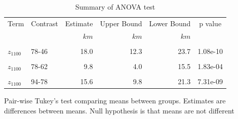 \documentclass[draft,linenumbers]{agujournal2018}
\begin{document}
\begin{table}

\caption{\label{tab:anova}Summary of ANOVA test}
\centering
\fontsize{8}{10}\selectfont
\begin{threeparttable}
\begin{tabular}[t]{llrrrl}
\toprule
\multicolumn{1}{c}{Term} & \multicolumn{1}{c}{Contrast} & \multicolumn{1}{c}{Estimate} & \multicolumn{1}{c}{Upper Bound} & \multicolumn{1}{c}{Lower Bound} & \multicolumn{1}{c}{p value} \\
 &  & $km$ & $km$ & $km$ & \\
\midrule
\cellcolor{gray!6}{$z_{1100}$} & \cellcolor{gray!6}{62-46} & \cellcolor{gray!6}{8.3} & \cellcolor{gray!6}{2.5} & \cellcolor{gray!6}{14.0} & \cellcolor{gray!6}{1.84e-03}\\
$z_{1100}$ & 78-46 & 18.0 & 12.3 & 23.7 & 1.08e-10\\
\cellcolor{gray!6}{$z_{1100}$} & \cellcolor{gray!6}{94-46} & \cellcolor{gray!6}{33.6} & \cellcolor{gray!6}{27.8} & \cellcolor{gray!6}{39.3} & \cellcolor{gray!6}{1.99e-11}\\
$z_{1100}$ & 78-62 & 9.8 & 4.0 & 15.5 & 1.83e-04\\
\cellcolor{gray!6}{$z_{1100}$} & \cellcolor{gray!6}{94-62} & \cellcolor{gray!6}{25.3} & \cellcolor{gray!6}{19.6} & \cellcolor{gray!6}{31.0} & \cellcolor{gray!6}{1.99e-11}\\
\addlinespace
$z_{1100}$ & 94-78 & 15.6 & 9.8 & 21.3 & 7.31e-09\\
\bottomrule
\end{tabular}
\begin{tablenotes}
\item Pair-wise Tukey's test comparing means between groups. Estimates are differences between means. Null hypothesis is that means are not different
\end{tablenotes}
\end{threeparttable}
\end{table}
\end{document}
